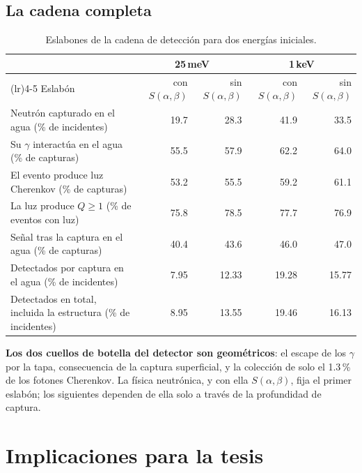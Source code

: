 \documentclass[11pt,a4paper]{article}
\newcommand{\sab}{$S(\alpha,\beta)$}
\begin{document}
\subsection{La cadena completa}

\begin{table}[H]
\centering
\small
\begin{tabularx}{\linewidth}{>{\raggedright\arraybackslash}Xrrrr}
\toprule
& \multicolumn{2}{c}{25\,meV} & \multicolumn{2}{c}{1\,keV} \\
\cmidrule(lr){2-3}\cmidrule(lr){4-5}
Eslabón & con \sab{} & sin \sab{} & con \sab{} & sin \sab{} \\
\midrule
Neutrón capturado en el agua (\% de incidentes) & 19.7 & 28.3 & 41.9 & 33.5 \\
Su $\gamma$ interactúa en el agua (\% de capturas) & 55.5 & 57.9 & 62.2 & 64.0 \\
El evento produce luz Cherenkov (\% de capturas) & 53.2 & 55.5 & 59.2 & 61.1 \\
La luz produce $Q\geq1$ (\% de eventos con luz) & 75.8 & 78.5 & 77.7 & 76.9 \\
Señal tras la captura en el agua (\% de capturas) & 40.4 & 43.6 & 46.0 & 47.0 \\
\midrule
Detectados por captura en el agua (\% de incidentes) & 7.95 & 12.33 & 19.28 & 15.77 \\
Detectados en total, incluida la estructura (\% de incidentes) & 8.95 & 13.55 & 19.46 & 16.13 \\
\bottomrule
\end{tabularx}
\caption{Eslabones de la cadena de detección para dos energías iniciales.}
\label{tab:cadena}
\end{table}

\textbf{Los dos cuellos de botella del detector son geométricos}: el escape de los $\gamma$ por la tapa, consecuencia de la captura superficial, y la colección de solo el 1.3\,\% de los fotones Cherenkov. La física neutrónica, y con ella \sab{}, fija el primer eslabón; los siguientes dependen de ella solo a través de la profundidad de captura.

\section{Implicaciones para la tesis}
\end{document}
